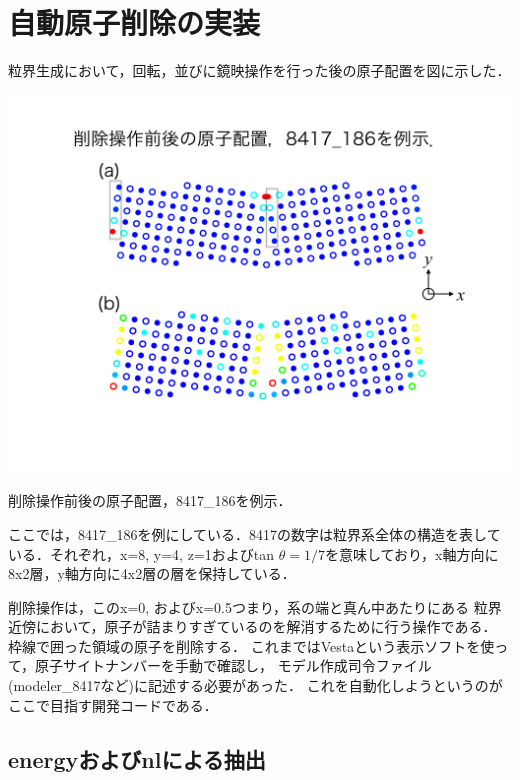 \chapter{自動原子削除の実装}\label{ux81eaux52d5ux539fux5b50ux524aux9664ux306eux5b9fux88c5}

粒界生成において，回転，並びに鏡映操作を行った後の原子配置を図に示した．

\begin{center}
\includegraphics[width=150mm]{../.././auto_delete/auto_delete.002.jpeg}
\end{center}
削除操作前後の原子配置，8417\_186を例示．

\label{fig:}

ここでは，8417\_186を例にしている．8417の数字は粒界系全体の構造を表している．それぞれ，x=8,
y=4, z=1およびtan
\(\theta=1/7\)を意味しており，x軸方向に8x2層，y軸方向に4x2層の層を保持している．

削除操作は，このx=0, およびx=0.5つまり，系の端と真ん中あたりにある
粒界近傍において，原子が詰まりすぎているのを解消するために行う操作である．
枠線で囲った領域の原子を削除する．
これまではVestaという表示ソフトを使って，原子サイトナンバーを手動で確認し，
モデル作成司令ファイル(modeler\_8417など)に記述する必要があった．
これを自動化しようというのがここで目指す開発コードである．

    \section{energyおよびnlによる抽出}\label{energyux304aux3088ux3073nlux306bux3088ux308bux62bdux51fa}

